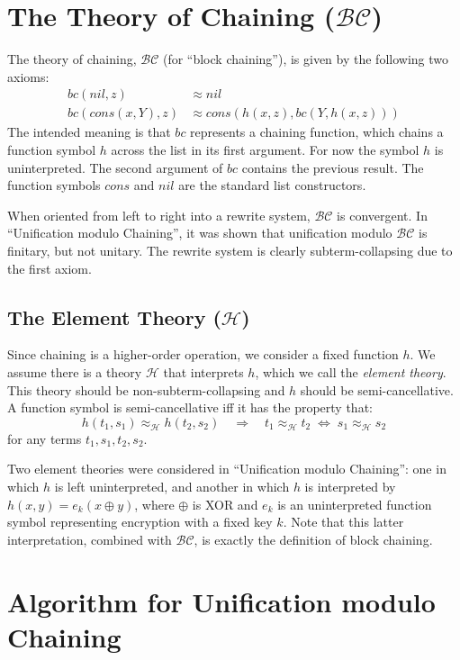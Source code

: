 \documentclass[11pt]{article}
\newcommand{\BC}{\mathcal{BC}}
\newcommand{\HH}{\mathcal{H}}
\newcommand{\Bc}{\mathit{bc}}
\newcommand{\Hh}{\mathit{h}}
\newcommand{\Cons}{\mathit{cons}}
\newcommand{\Nil}{\mathit{nil}}
\begin{document}
\section{The Theory of Chaining ($\BC$)}\label{section:theory}

The theory of chaining, $\BC$ (for ``block chaining''), is given by the
following two axioms:
\begin{align*}
    \Bc(\Nil, z) &\approx \Nil \\
    \Bc(\Cons(x, Y), z) &\approx \Cons(\Hh(x, z), \Bc(Y, \Hh(x, z)))
\end{align*}
The intended meaning is that $\Bc$ represents a chaining function, which chains
a function symbol $\Hh$ across the list in its first argument. For now the
symbol $\Hh$ is uninterpreted. The second argument of $\Bc$ contains the
previous result. The function symbols $\Cons$ and $\Nil$ are the standard list
constructors.

When oriented from left to right into a rewrite system, $\BC$ is convergent.
In ``Unification modulo Chaining'', it was shown that unification modulo $\BC$
is finitary, but not unitary. The rewrite system is clearly subterm-collapsing
due to the first axiom.

\subsection{The Element Theory ($\HH$)}\label{subsection:element-theory}

Since chaining is a higher-order operation, we consider a fixed function $\Hh$.
We assume there is a theory $\HH$ that interprets $\Hh$, which we call the
\emph{element theory}. This theory should be non-subterm-collapsing and
$\Hh$ should be semi-cancellative. A function symbol is semi-cancellative iff
it has the property that:
\[ \Hh(t_1, s_1) \approx_\HH^{} \Hh(t_2, s_2) \quad \Rightarrow \quad
t_1 \approx_\HH^{} t_2 \; \Leftrightarrow \; s_1 \approx_\HH^{} s_2 \]
for any terms $t_1, s_1, t_2, s_2$.

Two element theories were considered in ``Unification modulo Chaining'': one in
which $\Hh$ is left uninterpreted, and another in which $\Hh$ is interpreted by
$\Hh(x, y) = e_k(x \oplus y)$, where $\oplus$ is XOR and $e_k$ is an
uninterpreted function symbol representing encryption with a fixed key $k$.
Note that this latter interpretation, combined with $\BC$, is exactly the
definition of block chaining.

\section{Algorithm for Unification modulo Chaining}\label{section:algorithm}
\end{document}
